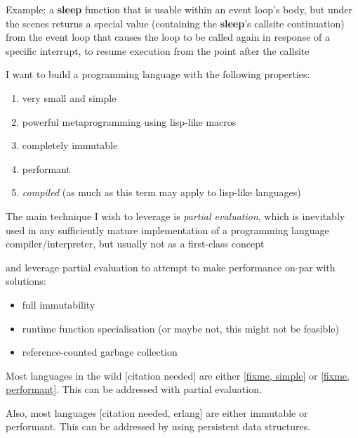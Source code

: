 \documentclass[main.tex]{subfiles}
\begin{document}
Example: a \textbf{sleep} function that is usable within an event loop's body,
but under the scenes returns a special value (containing the \textbf{sleep}'s callsite
continuation) from the event loop that causes the loop to be called again
in response of a specific interrupt, to resume execution from the point after the callsite

\pagebreak

I want to build a programming language with the following properties:
\begin{enumerate}
    \item very small and simple
    \item powerful metaprogramming using lisp-like macros
    \item completely immutable
    \item performant
    \item \emph{compiled} (as much as this term may apply to lisp-like languages)
\end{enumerate}

The main technique I wish to leverage is \emph{partial evaluation}, which is
inevitably used in any sufficiently mature implementation of a programming
language compiler/interpreter, but usually not as a first-class concept

 and
leverage partial evaluation to attempt to make performance on-par with
 solutions:
\begin{itemize}
    \item full immutability
    \item runtime function specialisation (or maybe not, this might not be feasible)
    \item reference-counted garbage collection
\end{itemize}

Most languages in the wild [citation needed] are either \ref{fixme, simple} or
\ref{fixme, performant}. This can be addressed with partial evaluation.

Also, most languages [citation needed, erlang] are either immutable or performant.
This can be addressed by using persistent data structures.



\end{document}
